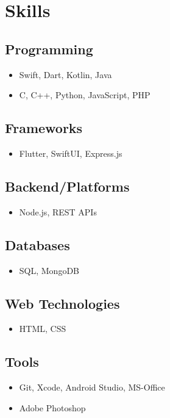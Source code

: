 \documentclass[]{plushcv}
\begin{document}
\begin{minipage}[t]{0.4\textwidth}

\section{Skills}
\subsection{Programming}
\begin{itemize}[leftmargin=*,noitemsep,topsep=2pt]
\item Swift, Dart, Kotlin, Java
\item C, C++, Python, JavaScript, PHP
\end{itemize}

\subsection{Frameworks}
\begin{itemize}[leftmargin=*,noitemsep,topsep=2pt]
\item Flutter, SwiftUI, Express.js
\end{itemize}

\subsection{Backend/Platforms}
\begin{itemize}[leftmargin=*,noitemsep,topsep=2pt]
\item Node.js, REST APIs
\end{itemize}

\subsection{Databases}
\begin{itemize}[leftmargin=*,noitemsep,topsep=2pt]
\item SQL, MongoDB
\end{itemize}

\subsection{Web Technologies}
\begin{itemize}[leftmargin=*,noitemsep,topsep=2pt]
\item HTML, CSS
\end{itemize}

\subsection{Tools}
\begin{itemize}[leftmargin=*,noitemsep,topsep=2pt]
\item Git, Xcode, Android Studio, MS-Office
\item Adobe Photoshop
\end{itemize}


\end{minipage}
\end{document}
